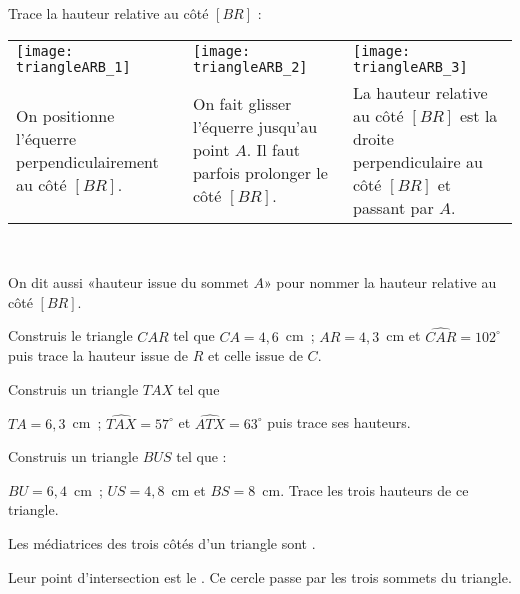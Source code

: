 \begin{methode*1}

 \begin{exemple*1}
 Trace la hauteur relative au côté $[BR]$ :
 \begin{tabularx}{\textwidth}{X|X|X}
 \texttt{[image: triangleARB\_1]} &  \texttt{[image: triangleARB\_2]} & \texttt{[image: triangleARB\_3]} \\ 
 On positionne l'équerre perpendiculairement au côté $[BR]$. & On fait glisser l'équerre jusqu'au point $A$. Il faut parfois prolonger le côté $[BR]$. & La hauteur relative au côté $[BR]$ est la droite perpendiculaire au côté $[BR]$ et passant par $A$. \\
\end{tabularx} \\

\end{exemple*1}

\begin{remarque}
On dit aussi «hauteur issue du sommet $A$» pour nommer la hauteur relative au côté $[BR]$.
 \end{remarque}
 
\exercice
Construis le triangle $CAR$ tel que 
$CA = 4,6$ cm ; $AR = 4,3$ cm et $\widehat{CAR} = 102^\circ$ puis trace la hauteur issue de $R$ et celle issue de $C$.
     
\exercice
Construis un triangle $TAX$ tel que 

$TA = 6,3$ cm ; $\widehat{TAX} = 57^\circ$ et $\widehat{ATX} = 63^\circ$ puis trace ses hauteurs.

\exercice
Construis un triangle $BUS$ tel que :

$BU = 6,4$ cm ; $US = 4,8$ cm et $BS = 8$ cm. Trace les trois hauteurs de ce triangle.

\end{methode*1}




\newpage

 \begin{aconnaitre}
Les médiatrices des trois côtés d'un triangle sont .

Leur point d'intersection est le . Ce cercle passe par les trois sommets du triangle.
\end{aconnaitre}

